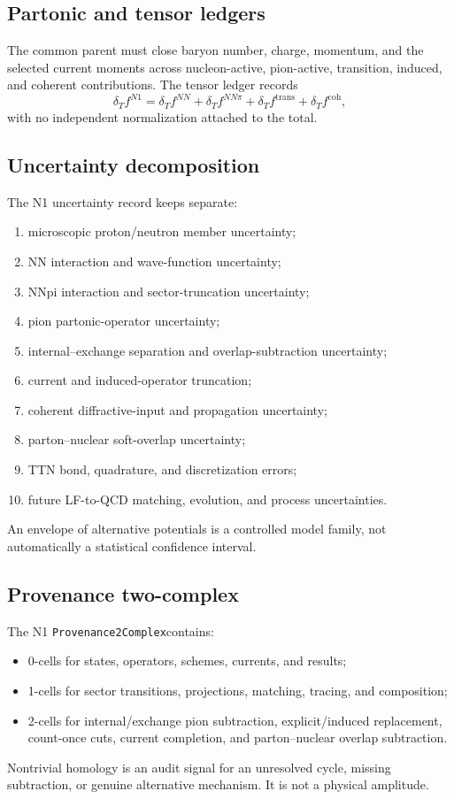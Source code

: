 \documentclass[11pt]{article}
\newcommand{\ProvComplex}{\texttt{Provenance2Complex}}
\begin{document}
\subsection{Partonic and tensor ledgers}

The common parent must close baryon number, charge, momentum, and the selected
current moments across nucleon-active, pion-active, transition, induced, and
coherent contributions.  The tensor ledger records
\begin{equation}
 \delta_Tf^{N1}
 =\delta_Tf^{NN}
 +\delta_Tf^{NN\pi}
 +\delta_Tf^{\mathrm{trans}}
 +\delta_Tf^{\mathrm{coh}},
 \label{eq:tensor-ledger}
\end{equation}
with no independent normalization attached to the total.

\subsection{Uncertainty decomposition}

The N1 uncertainty record keeps separate:
\begin{enumerate}
\item microscopic proton/neutron member uncertainty;
\item NN interaction and wave-function uncertainty;
\item NNpi interaction and sector-truncation uncertainty;
\item pion partonic-operator uncertainty;
\item internal--exchange separation and overlap-subtraction uncertainty;
\item current and induced-operator truncation;
\item coherent diffractive-input and propagation uncertainty;
\item parton--nuclear soft-overlap uncertainty;
\item TTN bond, quadrature, and discretization errors;
\item future LF-to-QCD matching, evolution, and process uncertainties.
\end{enumerate}
An envelope of alternative potentials is a controlled model family, not
automatically a statistical confidence interval.

\subsection{Provenance two-complex}

The N1 \ProvComplex contains:
\begin{itemize}
\item 0-cells for states, operators, schemes, currents, and results;
\item 1-cells for sector transitions, projections, matching, tracing, and
composition;
\item 2-cells for internal/exchange pion subtraction, explicit/induced
replacement, count-once cuts, current completion, and parton--nuclear overlap
subtraction.
\end{itemize}
Nontrivial homology is an audit signal for an unresolved cycle, missing
subtraction, or genuine alternative mechanism.  It is not a physical
amplitude.
\end{document}
